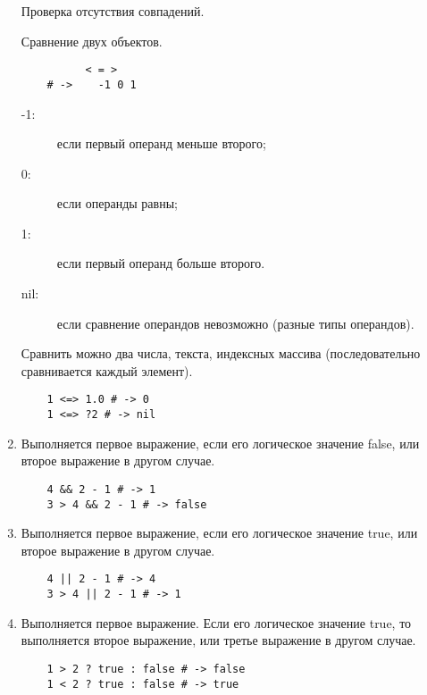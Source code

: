 \begin{enumerate}
  \begin{operator}
    Проверка отсутствия совпадений.
  \end{operator}

  \begin{operator}
    Сравнение двух объектов.
    \begin{verbatim}
          < = >
    # ->	-1 0 1
    \end{verbatim}
    \begin{description}
      \item[-1:]  если первый операнд меньше второго;
      \item[0:]   если операнды равны;
      \item[1:]   если первый операнд больше второго.
      \item[nil:] если сравнение операндов невозможно (разные типы операндов).
    \end{description}

    Сравнить можно два числа, текста, индексных массива (последовательно сравнивается каждый элемент).
    \begin{verbatim}
    1 <=> 1.0 # -> 0
    1 <=> ?2 # -> nil
    \end{verbatim}
  \end{operator}

  \item %
  \begin{operator}
    Выполняется первое выражение, если его логическое значение false, или второе выражение в другом случае.
    \begin{verbatim}
    4 && 2 - 1 # -> 1
    3 > 4 && 2 - 1 # -> false
    \end{verbatim}
  \end{operator}

  \item %
  \begin{operator}
    Выполняется первое выражение, если его логическое значение true, или второе выражение в другом случае.
    \begin{verbatim}
    4 || 2 - 1 # -> 4
    3 > 4 || 2 - 1 # -> 1
    \end{verbatim}
  \end{operator}

  \item %
  \begin{operator}
    Выполняется первое выражение. Если его логическое значение true, то выполняется второе выражение, или третье выражение в другом случае.
    \begin{verbatim}
    1 > 2 ? true : false # -> false
    1 < 2 ? true : false # -> true
    \end{verbatim}
  \end{operator}


\end{enumerate}
